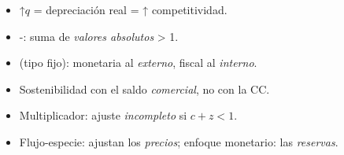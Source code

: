 \documentclass{article}
\begin{document}
\begin{columnas}
\begin{enumerate}
\end{enumerate}
\begin{trampa}
\begin{itemize}
\item ↑$q$ = depreciación real = ↑ competitividad.
\item {}-: suma de \emph{valores absolutos} > 1.
\item {} (tipo fijo): monetaria al \emph{externo}, fiscal al \emph{interno}.
\item Sostenibilidad con el saldo \emph{comercial}, no con la CC.
\item Multiplicador: ajuste \emph{incompleto} si $c+z<1$.
\item Flujo-especie: ajustan los \emph{precios}; enfoque monetario: las \emph{reservas}.
\end{itemize}
\end{trampa}

\end{columnas}
\end{document}
